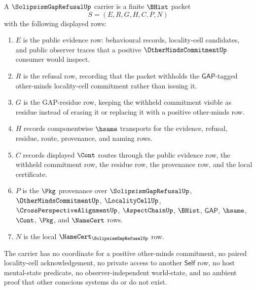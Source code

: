 \begin{definition}
\label{def:solipsism-gap-refusal-carrier}
A $\SolipsismGapRefusalUp$ carrier is a finite $\BHist$ packet
$$
S=(E,R,G,H,C,P,N)
$$
with the following displayed rows:
\begin{enumerate}
\item $E$ is the public evidence row: behavioural records, locality-cell candidates, and public observer traces that a positive $\OtherMindsCommitmentUp$ consumer would inspect.
\item $R$ is the refusal row, recording that the packet withholds the $\mathsf{GAP}$-tagged other-minds locality-cell commitment rather than issuing it.
\item $G$ is the GAP-residue row, keeping the withheld commitment visible as residue instead of erasing it or replacing it with a positive other-minds row.
\item $H$ records componentwise $\hsame$ transports for the evidence, refusal, residue, route, provenance, and naming rows.
\item $C$ records displayed $\Cont$ routes through the public evidence row, the withheld commitment row, the residue row, the provenance row, and the local certificate.
\item $P$ is the $\Pkg$ provenance over $\SolipsismGapRefusalUp$, $\OtherMindsCommitmentUp$, $\LocalityCellUp$, $\CrossPerspectiveAlignmentUp$, $\AspectChainUp$, $\BHist$, $\mathsf{GAP}$, $\hsame$, $\Cont$, $\Pkg$, and $\NameCert$ rows.
\item $N$ is the local $\NameCert_{\SolipsismGapRefusalUp}$ row.
\end{enumerate}
The carrier has no coordinate for a positive other-minds commitment, no paired locality-cell acknowledgement, no private access to another $\mathsf{Self}$ row, no host mental-state predicate, no observer-independent world-state, and no ambient proof that other conscious systems do or do not exist.
\end{definition}

